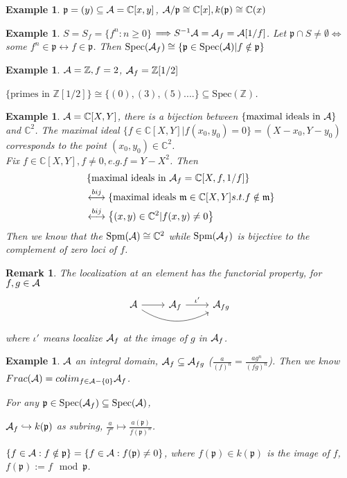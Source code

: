 \documentclass[11pt]{article}
\newtheorem{rmk}[thm]{Remark}
\newtheorem{ex}[thm]{Example}
\newcommand{\cplx}{\mathbb C}
\newcommand{\intg}{\mathbb Z}
\newcommand{\scm}{{\mathfrak m}}
\newcommand{\scp}{{\mathfrak p}}
\newcommand{\cala}{{\cal A}}
\newcommand{\Lrta}{\Longrightarrow}
\newcommand{\Llrta}{\Longleftrightarrow}
\newcommand{\inj}{\hookrightarrow}
\begin{document}
\begin{ex}
$\scp=(y)\subseteq\cala=\cplx[x,y]$, $\cala/\scp\cong \cplx[x], k(\scp)\cong \cplx(x)$
\end{ex}

\begin{ex}
$S=S_f=\{f^n:n\geq0\}$
$\Lrta S^{-1}\cala=\cala_f=\cala[1/f]$. Let $\scp\cap S\neq \emptyset\Llrta$ some $f^n\in \scp\leftrightarrow f\in \scp$.
Then $\text{Spec}(\cala_f)\cong \{\scp\in \text{Spec}(\cala)|f\notin \scp\}$
\end{ex}

\begin{ex}
$\cala=\intg,f=2$, $\cala_f=\intg[1/2]$

$\{\text{primes in }\intg[1/2]\}\cong \{(0),(3),(5)....\}\subseteq\text{Spec}(\intg)$.
\end{ex}

\begin{ex}
$\cala=\cplx[X,Y]$, there is a bijection between $\{\text{maximal ideals in }\cala\}$ and $\cplx^2$.
The maximal ideal $\{f\in \cplx[X,Y]| f(x_0,y_0)=0\}=(X-x_0, Y-y_0)$ corresponds to the point $(x_0,y_0)\in \cplx^2$.\\
Fix $f\in \cplx[X,Y], f\neq 0, e.g. f=Y-X^2$.
Then 
$$
\begin{aligned}
&\left\{ \text{maximal ideals in  }\cala_f=\cplx[X,f,1/f]\right\}\\
&\overset{bij}{\longleftrightarrow} \left\{\text{maximal ideals }\scm\in \cplx[X,Y] s.t. f\notin \scm\right\}\\
& \overset{bij}{\longleftrightarrow}\left\{(x,y)\in \cplx^2|f(x,y)\neq 0\right\}
\end{aligned}
$$
Then we know that the $\text{Spm}(\cala)\cong \cplx^2$ while $\text{Spm}(\cala_f)$ is bijective to the complement of zero loci of $f$.
\end{ex}

\begin{rmk}
The localization at an element has the functorial property, for $f,g\in\cala$
\[
\begin{tikzcd}
\cala\ar[r]\ar[rr,bend right]&\cala_f\ar[r, "\iota'"]&\cala_{fg}  
\end{tikzcd}
\]
where $\iota'$ means localize $\cala_f$ at the image of $g$ in $\cala_f$.
\end{rmk}

\begin{ex}
$\cala$ an integral domain, $\cala_f\subseteq \cala_{fg}$ ($\frac{a}{(f)^n}=\frac{a g^n}{(fg)^n}$). Then we know $Frac(\cala)=colim_{f\in \cala-\{0\}}\cala_f$. 

For any $\scp\in \text{Spec}(\cala_f)\subseteq\text{Spec}(\cala)$,

{\color{red}$\cala_f\inj k(\scp)$ as subring, $\frac{a}{f^n}\longmapsto \frac{a(\scp)}{f(\scp)^n}$.}

$\{f\in \cala:f\notin \scp\}=\{f\in \cala:f(\scp)\neq 0\}$, where $f(\scp)\in k(\scp)$ is the image of $f$, $f(\scp):=f\mod \scp$.
\end{ex}
\end{document}
